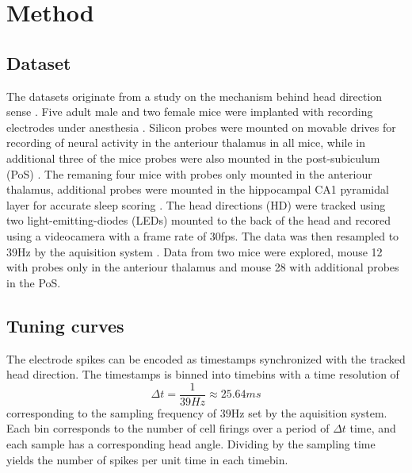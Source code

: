 \section{Method}
\subsection{Dataset}
The datasets originate from a study on the mechanism behind head direction sense \cite{projectdata}.
Five adult male and two female mice were implanted with recording electrodes under anesthesia \cite{projectdata}.
Silicon probes were mounted on movable drives for recording of neural activity in the anteriour thalamus in all mice, while in additional three of the mice probes were also mounted in the post-subiculum (PoS) \cite{projectdata}. The remaning four mice with probes only mounted in the anteriour thalamus, additional probes were mounted in the hippocampal CA1 pyramidal layer for accurate sleep scoring \cite{projectdata}.
The head directions (HD) were tracked using two light-emitting-diodes (LEDs) mounted to the back of the head and recored using a videocamera with a frame rate of 30fps. The data was then resampled to 39Hz by the aquisition system \cite{projectdata}.
Data from two mice were explored, mouse 12 with probes only in the anteriour thalamus and mouse 28 with additional probes in the PoS.  
\subsection{Tuning curves}
The electrode spikes can be encoded as timestamps synchronized with the tracked head direction. The timestamps is binned into timebins with a time resolution of 
$$\Delta t = \frac{1}{39Hz} \approx 25.64ms$$ 
corresponding to the sampling frequency of $39$Hz set by the aquisition system.
Each bin corresponds to the number of cell firings over a period of $\Delta t$ time, and each sample has a corresponding head angle.
Dividing by the sampling time yields the number of spikes per unit time in each timebin.

